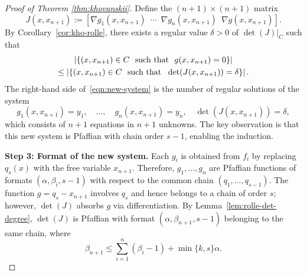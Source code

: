 \begin{proof}[Proof of Theorem \ref{thm:khovanskii}]
Define the $(n+1) \times (n+1)$ matrix
\begin{equation} \label{eqn:matrix-J}
  J(x, x_{n+1}) := \left[\nabla g_1(x, x_{n+1}) \enspace \cdots \enspace \nabla g_n(x, x_{n+1}) \enspace \nabla g(x, x_{n+1}) \right].
\end{equation}
By Corollary~\ref{cor:kho-rolle}, there exists a regular value $\delta > 0$ of $\det(J)|_C$ such that
\begin{multline} \label{eqn:new-system}
  \left\vert {\left\{(x, x_{n+1}) \in C \ \text{ such that }\ g(x, x_{n+1}) = 0\right\}} \right\vert \\
  \le \left\vert {\left\{(x, x_{n+1}) \in C \ \text{ such that }\ \det(J(x, x_{n+1})) = \delta\right\}} \right\vert.
\end{multline}
The right-hand side of~\eqref{eqn:new-system} is the number of regular solutions of the system
\begin{equation} \label{eqn:lifted-system}
  g_1(x, x_{n+1}) = y_1, \quad \ldots, \quad g_n(x, x_{n+1}) = y_n, \quad \det(J(x, x_{n+1})) = \delta,
\end{equation}
which consists of $n+1$ equations in $n+1$ unknowns. The key observation is that this new system is Pfaffian with chain order $s-1$, enabling the induction.

\medskip
\noindent\textbf{Step 3: Format of the new system.}
Each $g_i$ is obtained from $f_i$ by replacing $q_s(x)$ with the free variable $x_{n+1}$. Therefore, $g_1, \ldots, g_n$ are Pfaffian functions of formats $(\alpha, \beta_i, s-1)$ with respect to the common chain $(q_1, \ldots, q_{s-1})$. The function $g = q_s - x_{n+1}$ involves $q_s$ and hence belongs to a chain of order $s$; however, $\det(J)$ absorbs $g$ via differentiation. By Lemma~\ref{lem:rolle-det-degree}, $\det(J)$ is Pfaffian with format $(\alpha, \beta_{n+1}, s-1)$ belonging to the same chain, where
\begin{equation} \label{eqn:beta-n+1-ub}
  \beta_{n+1} \le \sum_{i=1}^n (\beta_i - 1) + \min\{k, s\}\alpha.
\end{equation}


\end{proof}
